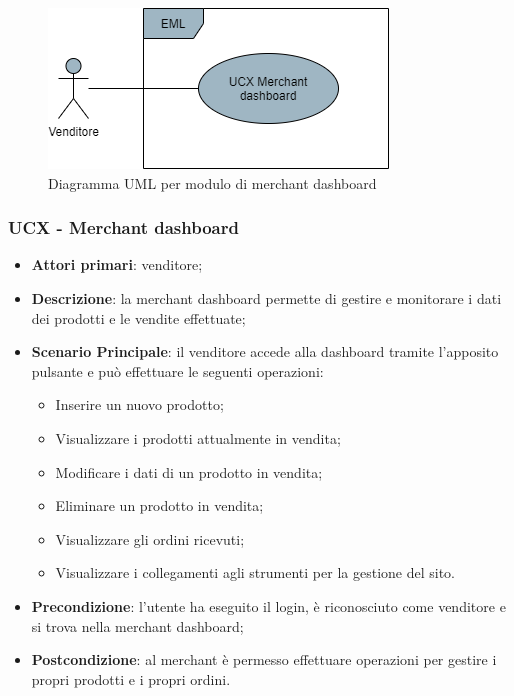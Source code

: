 \begin{figure}[H]
\centering
\includegraphics[scale=0.6]{res/UseCase/Immagini/MerchantDashboardGenerale}
\caption{Diagramma UML per modulo di merchant dashboard}
\end{figure}

\subsubsection{UCX - Merchant dashboard}
\begin{itemize}
\item \textbf{Attori primari}: venditore;
\item \textbf{Descrizione}: la merchant dashboard permette di gestire e monitorare i dati dei prodotti e le vendite effettuate;
\item \textbf{Scenario Principale}: il venditore accede alla dashboard tramite l'apposito pulsante e può effettuare le seguenti operazioni:
\begin{itemize}
	\item Inserire un nuovo prodotto;
	\item Visualizzare i prodotti attualmente in vendita;
	\item Modificare i dati di un prodotto in vendita;
	\item Eliminare un prodotto in vendita;
	\item Visualizzare gli ordini ricevuti;
	\item Visualizzare i collegamenti agli strumenti per la gestione del sito.
\end{itemize}
\item \textbf{Precondizione}: l'utente ha eseguito il login, è riconosciuto come venditore e si trova nella merchant dashboard;
\item \textbf{Postcondizione}: al merchant è permesso effettuare operazioni   per gestire i propri prodotti e i propri ordini.
\end{itemize}

